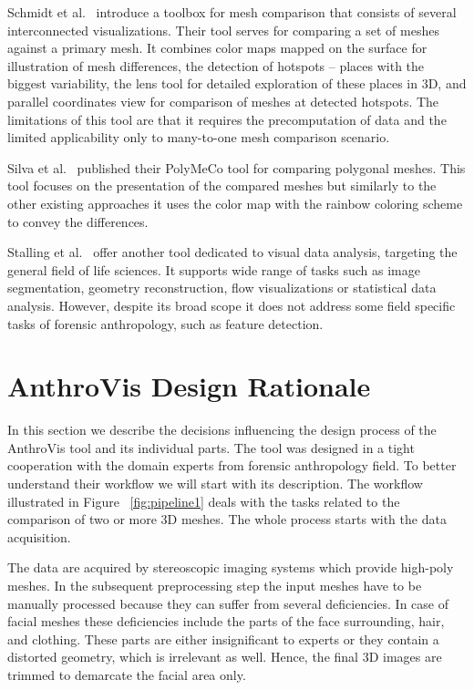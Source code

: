 \documentclass[final,5p,times]{elsarticle}
\begin{document}
Schmidt et al.~\cite{ymca} introduce a toolbox for mesh comparison that consists of several interconnected visualizations.
Their tool serves for comparing a set of meshes against a primary mesh.
It combines color maps mapped on the surface for illustration of mesh differences, the detection of hotspots -- places with the biggest variability, the lens tool for detailed exploration of these places in 3D, and parallel coordinates view for comparison of meshes at detected hotspots.
The limitations of this tool are that it requires the precomputation of data and the limited applicability only to many-to-one mesh comparison scenario.

Silva et al.~\cite{Silva2005} published their PolyMeCo tool for comparing polygonal meshes. 
This tool focuses on the presentation of the compared meshes but similarly to the other existing approaches it uses the color map with the rainbow coloring scheme to convey the differences.

Stalling et al.~\cite{stalling200538} offer another tool dedicated to visual data analysis, targeting the general field of life sciences. 
It supports wide range of tasks such as image segmentation, geometry reconstruction, flow visualizations or statistical data analysis.
However, despite its broad scope it does not address some field specific tasks of forensic anthropology, such as feature detection.

\section{AnthroVis Design Rationale} \label{overview}
In this section we describe the decisions influencing the design process of the AnthroVis tool and its individual parts.
The tool was designed in a tight cooperation with the domain experts from forensic anthropology field.
To better understand their workflow we will start with its description.
The workflow illustrated in Figure ~\ref{fig:pipeline1} deals with the tasks related to the comparison of two or more 3D meshes.
The whole process starts with the data acquisition.

The data are acquired by stereoscopic imaging systems which provide high-poly meshes. 
In the subsequent preprocessing step the input meshes have to be manually processed because they can suffer from several deficiencies. 
In case of facial meshes these deficiencies include the parts of the face surrounding, hair, and clothing.
These parts are either insignificant to experts or they contain a distorted geometry, which is irrelevant as well. 
Hence, the final 3D images are trimmed to demarcate the facial area only.
\end{document}
